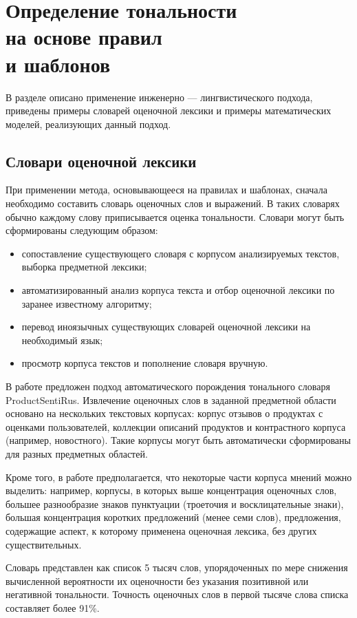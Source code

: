 \chapter[Определение тональности на основе правил и шаблонов]{Определение тональности \\ на основе правил \\и шаблонов}
В разделе описано применение инженерно --- лингвистического подхода, приведены примеры словарей оценочной лексики и примеры математических моделей, реализующих данный подход.
\section{Словари оценочной лексики}
При применении метода, основывающееся на правилах и шаблонах, сначала необходимо составить словарь оценочных слов и выражений. В таких словарях обычно каждому слову приписывается оценка тональности. Словари могут быть сформированы следующим образом:
\begin{itemize}
	\item сопоставление существующего словаря с корпусом анализируемых текстов, выборка предметной лексики;
	\item автоматизированный анализ корпуса текста и отбор оценочной лексики по заранее известному алгоритму;
	\item перевод иноязычных существующих словарей оценочной лексики на необходимый язык;
	\item просмотр корпуса текстов и пополнение словаря вручную.
\end{itemize}

В работе \cite{productrus} предложен подход автоматического порождения тонального словаря ProductSentiRus. Извлечение оценочных слов в заданной предметной области основано на
нескольких текстовых корпусах: корпус отзывов о продуктах с оценками пользователей, коллекции описаний продуктов и контрастного корпуса (например, новостного). Такие корпусы могут быть автоматически сформированы для разных предметных областей. 

Кроме того, в работе предполагается, что некоторые части корпуса мнений можно выделить: например, корпусы, в которых выше концентрация оценочных слов, большее разнообразие знаков пунктуации (троеточия и восклицательные знаки), большая концентрация коротких предложений (менее семи слов), предложения, содержащие аспект, к которому применена оценочная лексика, без других существительных.

Словарь представлен как список 5 тысяч слов, упорядоченных по мере снижения вычисленной вероятности их оценочности без указания позитивной или негативной тональности. Точность оценочных слов в первой тысяче слова списка составляет более 91\%. 



